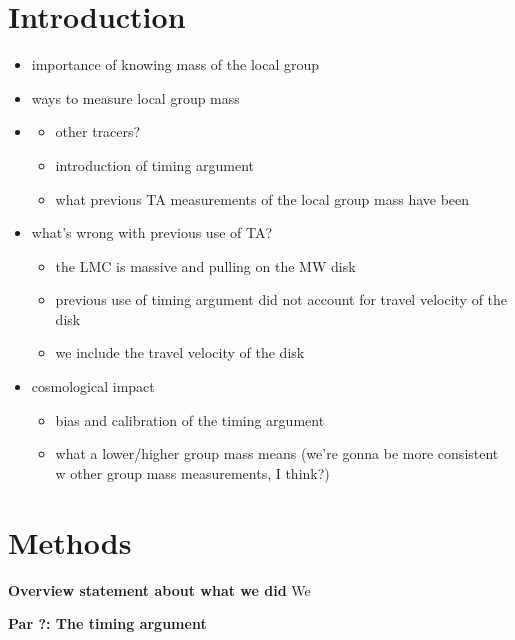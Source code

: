 \documentclass[twocolumn]{aastex631}
\begin{document}
\section{Introduction}
\label{sec:intro}

\begin{itemize}
    \item importance of knowing mass of the local group
    \item ways to measure local group mass
    \item \begin{itemize}
            \item other tracers? 
            \item introduction of timing argument 
            \item what previous TA measurements of the local group mass have been
          \end{itemize}
    \item what's wrong with previous use of TA?
        \begin{itemize}
            \item the LMC is massive and pulling on the MW disk
            \item previous use of timing argument did not account for travel velocity of the disk
            \item we include the travel velocity of the disk
        \end{itemize}
    \item cosmological impact
        \begin{itemize}
            \item bias and calibration of the timing argument 
            \item what a lower/higher group mass means (we're gonna be more consistent w other group mass measurements, I think?)
        \end{itemize}
    
\end{itemize}

\section{Methods}\label{sec:methods}
\textbf{Overview statement about what we did}
We 

\textbf{Par ?: The timing argument }
\end{document}
